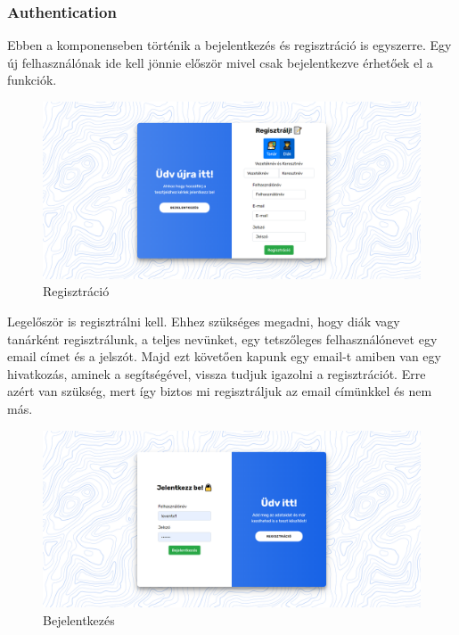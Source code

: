 \subsubsection{Authentication}

Ebben a komponenseben történik a bejelentkezés és regisztráció is egyszerre. Egy új felhasználónak ide kell jönnie először mivel csak bejelentkezve érhetőek el a funkciók.


\begin{figure}[H]
    \centering
    \includegraphics[width=\linewidth]{images/signin.png}
    \caption{Regisztráció}
    \label{fig:signin}
\end{figure}


Legelőször is regisztrálni  kell. Ehhez szükséges megadni, hogy diák vagy tanárként regisztrálunk, a teljes nevünket, egy tetszőleges felhasználónevet egy email címet és a jelszót. Majd ezt követően kapunk egy email-t amiben van egy hivatkozás, aminek a segítségével, vissza tudjuk igazolni a regisztrációt. Erre azért van szükség, mert így biztos mi regisztráljuk az email címünkkel és nem más.

\begin{figure}[H]
    \centering
    \includegraphics[width=\linewidth]{images/login.png}
    \caption{Bejelentkezés}
    \label{fig:login}
\end{figure}

